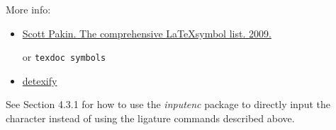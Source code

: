 \documentclass{article}
\begin{document}
\begin{minipage}{\textwidth}
\vspace{1\baselineskip}
More info:
\begin{itemize}
    \item \href{http://mirror.ctan.org/info/symbols/comprehensive}{Scott Pakin. The comprehensive \LaTeX symbol list. 2009.} 
    
    or \verb|texdoc symbols|
    \item \href{https://detexify.kirelabs.org/classify.html}{detexify}
\end{itemize}
\end{minipage}

\vspace{1\baselineskip}
See Section 4.3.1 for how to use the \emph{inputenc} package to directly input
the character instead of using the ligature commands described above.
\end{document}
